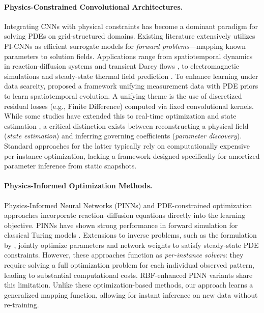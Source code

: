 \documentclass{article} %
\begin{document}
\paragraph{Physics-Constrained Convolutional Architectures.}
Integrating CNNs with physical constraints has become a dominant paradigm for solving PDEs on grid-structured domains. Existing literature extensively utilizes PI-CNNs as efficient surrogate models for \textit{forward problems}—mapping known parameters to solution fields. Applications range from spatiotemporal dynamics in reaction-diffusion systems \cite{yuan2024fpicnn} and transient Darcy flows \cite{zhang2022pidcnn}, to electromagnetic simulations \cite{emekci2024physics} and steady-state thermal field prediction \cite{zhao2023physics}. To enhance learning under data scarcity, \cite{rao2023encoding} proposed a framework unifying measurement data with PDE priors to learn spatiotemporal evolution. A unifying theme is the use of discretized residual losses (e.g., Finite Difference) computed via fixed convolutional kernels. While some studies have extended this to real-time optimization \cite{Ge2024microgrid} and state estimation \cite{kelshaw2024inverse}, a critical distinction exists between reconstructing a physical field (\textit{state estimation}) and inferring governing coefficients (\textit{parameter discovery}). Standard approaches for the latter typically rely on computationally expensive per-instance optimization, lacking a framework designed specifically for amortized parameter inference from static snapshots.

\paragraph{Physics-Informed Optimization Methods.}
Physics-Informed Neural Networks (PINNs) and PDE-constrained optimization approaches incorporate reaction–diffusion equations directly into the learning objective. PINNs have shown strong performance in forward simulation for classical Turing models \cite{hariri2025physics}. Extensions to inverse problems, such as the formulation by \cite{kho2022design}, jointly optimize parameters and network weights to satisfy steady-state PDE constraints. However, these approaches function as \textit{per-instance solvers}: they require solving a full optimization problem for each individual observed pattern, leading to substantial computational costs. RBF-enhanced PINN variants \cite{matasgil2024unraveling} share this limitation. Unlike these optimization-based methods, our approach learns a generalized mapping function, allowing for instant inference on new data without re-training.
\end{document}
